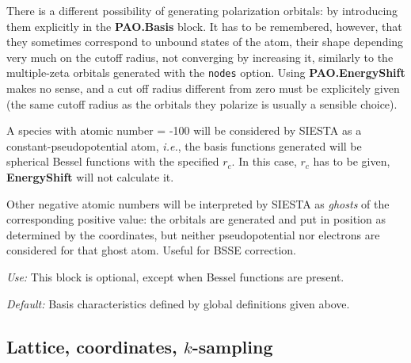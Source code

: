 \begin{description}
There is a different possibility of generating polarization orbitals:
by introducing them explicitly in the {\bf PAO.Basis} block.
It has to be remembered, however, that they sometimes correspond to 
unbound states of the atom, their shape depending very much on the
cutoff radius, not converging by increasing it, similarly to the
multiple-zeta orbitals generated with the {\tt nodes} option. 
Using {\bf PAO.EnergyShift} makes no sense, and a cut off 
radius different from zero must be explicitely given (the same cutoff radius
as the orbitals they polarize is usually a sensible choice).


A species with atomic number = -100 will be considered by SIESTA as
a constant-pseudopotential atom, {\it i.e.}, the basis functions
generated will be spherical Bessel functions
with the specified $r_c$. In this case, $r_c$ has to be given, 
{\bf EnergyShift} will not calculate it.

Other negative atomic numbers will be interpreted by SIESTA as 
{\it ghosts} 
of the corresponding positive value: the orbitals
are generated and put in position as determined by the coordinates,
but neither pseudopotential nor electrons are considered for that
ghost atom. Useful for BSSE correction.


{\it Use:} This block is optional, except when Bessel functions are present. 

{\it Default:} Basis characteristics defined by global definitions given
above.

\end{description}


\vspace{5pt}
\subsection{Lattice, coordinates, $k$-sampling}

